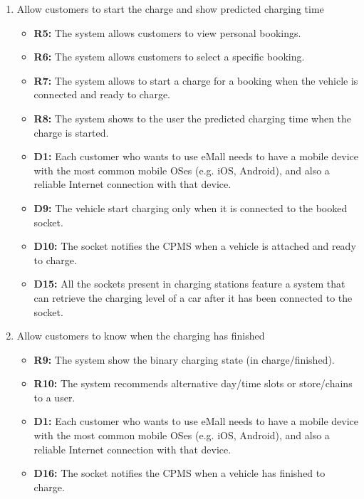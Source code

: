 \begin{enumerate}[label=\textbf{-G\arabic*}:]
{\begin{itemize}
          \end{itemize}
          }
    \item {Allow customers to start the charge and show predicted charging time
          \begin{itemize}
              \item \textbf{R5:} The system allows customers to view personal bookings.
              \item \textbf{R6:} The system allows customers to select a specific booking.
              \item \textbf{R7:} The system allows to start a charge for a booking when the vehicle is connected and ready to charge.
              \item \textbf{R8:} The system shows to the user the predicted charging time when the charge is started.
              \item \textbf{D1:} Each customer who wants to use eMall needs to have a mobile device with the most common mobile OSes (e.g. iOS, Android), and also a reliable Internet connection with that device.
              \item \textbf{D9:} The vehicle start charging only when it is connected to the booked socket.
              \item \textbf{D10:} The socket notifies the CPMS when a vehicle is attached and ready to charge.
              \item \textbf{D15:} All the sockets present in charging stations feature a system that can retrieve the charging level of a car after it has been connected to the socket.
          \end{itemize}
          }
    \item {Allow customers to know when the charging has finished
          \begin{itemize}
              \item \textbf{R9:} The system show the binary charging state (in charge/finished).
              \item \textbf{R10:} The system recommends alternative day/time slots or store/chains to a user.
              \item \textbf{D1:} Each customer who wants to use eMall needs to have a mobile device with the most common mobile OSes (e.g. iOS, Android), and also a reliable Internet connection with that device.
              \item \textbf{D16:} The socket notifies the CPMS when a vehicle has finished to charge.
          \end{itemize}
}
\end{enumerate}
